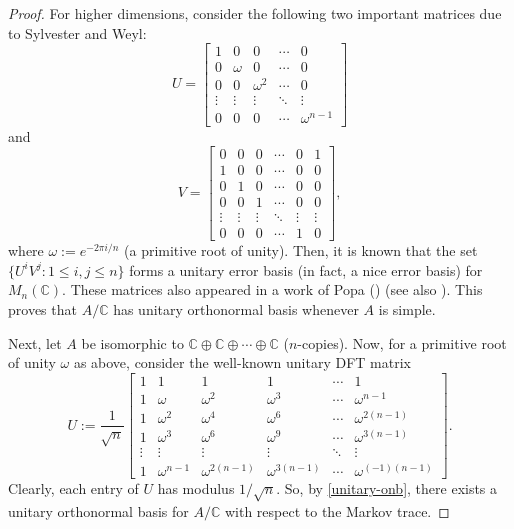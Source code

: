\documentclass{amsart}
\theoremstyle{definition}
\theoremstyle{theorem}
\newcommand{\C}{\mathbb{C}}
\begin{document}
\begin{proof}
  For higher dimensions, consider the following two important matrices
  due to Sylvester and Weyl:
  \begin{equation*}
 U=
 \begin{bmatrix}
  1 & 0 & 0 & \cdots & 0\\
  0 & \omega & 0 &  \cdots & 0\\
  0 & 0 & {\omega}^2 & \cdots & 0\\
  \vdots & \vdots & \vdots & \ddots & \vdots\\
  0 & 0 & 0 & \cdots & {\omega}^{n-1}
 \end{bmatrix}
\end{equation*}
and
\begin{equation*}
V= 
\begin{bmatrix}
0 & 0 & 0 &   \cdots & 0  & 1\\
1 & 0 & 0 &   \cdots & 0  & 0 \\
0 & 1 & 0 &  \cdots  & 0  & 0\\
0 & 0 & 1 &  \cdots & 0 & 0\\
\vdots  & \vdots  & \vdots & \ddots & \vdots & \vdots\\
0 & 0 & 0 & \cdots & 1 &  0 
\end{bmatrix},
\end{equation*}
where $\omega := e^{-2\pi i /n}$ (a primitive root
   of unity). Then, it is known that the set $\{U^iV^j:
1\leq i,j\leq n\}$ forms a unitary error basis (in fact, a nice error
basis) for $M_n(\C)$.  These matrices also appeared in a work of Popa (\cite{pop}) (see also \cite{S}).  This
proves that $A/\C$ has unitary orthonormal basis whenever $A$ is
simple.


   Next, let $A$ be isomorphic to $\C\oplus \C \oplus \cdots \oplus
   \C$ ($n$-copies). Now, for a primitive root of unity $\omega$ as above,
   consider the well-known unitary DFT matrix
  \[
  U := \frac{1}{\sqrt{n}}
  \begin{bmatrix}
1 & 1 & 1 & 1& \cdots & 1\\
1 & \omega & \omega^2 & \omega^3 & \cdots & \omega^{n-1}\\
1& \omega^2 & \omega^4 & \omega^6 & \cdots & \omega^{2(n-1)}\\
1& \omega^3 & \omega^6 & \omega^9 & \cdots & \omega^{3(n-1)}\\
\vdots & \vdots & \vdots & \vdots& \ddots & \vdots\\
1& \omega^{n-1} & \omega^{2(n-1)} & \omega^{3(n-1)} & \cdots & \omega^{(-1)(n-1)}
    \end{bmatrix}.
  \]
  Clearly, each entry of $U$ has modulus $1/\sqrt{n}$. So,  by \cref{unitary-onb}, there exists a
  unitary orthonormal basis for $A/\C$ with respect to the Markov
  trace.
\end{proof}
\end{document}
